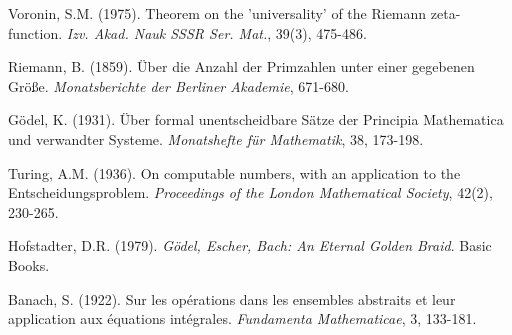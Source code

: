 \documentclass[12pt]{article}
\theoremstyle{plain}
\theoremstyle{definition}
\begin{document}
\begin{thebibliography}{99}

 Voronin, S.M. (1975). Theorem on the 'universality' of the Riemann zeta-function. \emph{Izv. Akad. Nauk SSSR Ser. Mat.}, 39(3), 475-486.

 Riemann, B. (1859). Über die Anzahl der Primzahlen unter einer gegebenen Größe. \emph{Monatsberichte der Berliner Akademie}, 671-680.

 Gödel, K. (1931). Über formal unentscheidbare Sätze der Principia Mathematica und verwandter Systeme. \emph{Monatshefte für Mathematik}, 38, 173-198.

 Turing, A.M. (1936). On computable numbers, with an application to the Entscheidungsproblem. \emph{Proceedings of the London Mathematical Society}, 42(2), 230-265.

 Hofstadter, D.R. (1979). \emph{Gödel, Escher, Bach: An Eternal Golden Braid}. Basic Books.

 Banach, S. (1922). Sur les opérations dans les ensembles abstraits et leur application aux équations intégrales. \emph{Fundamenta Mathematicae}, 3, 133-181.

\end{thebibliography}
\end{document}
